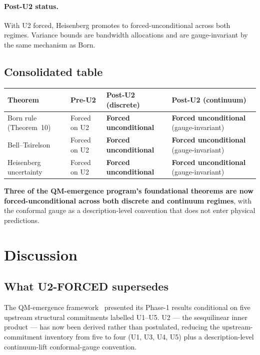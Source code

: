 \documentclass[11pt,a4paper]{article}
\begin{document}
\paragraph{Post-U2 status.} With U2 forced, Heisenberg promotes to forced-unconditional across both regimes. Variance bounds are bandwidth allocations and are gauge-invariant by the same mechanism as Born.

\subsection{Consolidated table}

\begin{center}
\begin{tabular}{llll}
\hline
Theorem & Pre-U2 & Post-U2 (discrete) & Post-U2 (continuum) \\
\hline
Born rule (Theorem~10) & Forced on U2 & \textbf{Forced unconditional} & \textbf{Forced unconditional} (gauge-invariant) \\
Bell--Tsirelson & Forced on U2 & \textbf{Forced unconditional} & \textbf{Forced unconditional} (gauge-invariant) \\
Heisenberg uncertainty & Forced on U2 & \textbf{Forced unconditional} & \textbf{Forced unconditional} (gauge-invariant) \\
\hline
\end{tabular}
\end{center}

\textbf{Three of the QM-emergence program's foundational theorems are now forced-unconditional across both discrete and continuum regimes}, with the conformal gauge as a description-level convention that does not enter physical predictions.

\section{Discussion}\label{sec:discussion}

\subsection{What U2-FORCED supersedes}

The QM-emergence framework~\cite{phase1} presented its Phase-1 results conditional on five upstream structural commitments labelled U1--U5. U2 --- the sesquilinear inner product --- has now been derived rather than postulated, reducing the upstream-commitment inventory from five to four (U1, U3, U4, U5) plus a description-level continuum-lift conformal-gauge convention.
\end{document}
